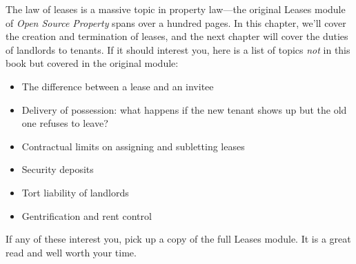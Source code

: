 The law of leases is a massive topic in property law---the original Leases
module of \emph{Open Source Property} spans over a hundred pages. In this
chapter, we'll cover the creation and termination of leases, and the next
chapter will cover the duties of landlords to tenants. If it should interest
you, here is a list of topics \emph{not} in this book but covered in the
original module:
\begin{itemize}
\item The difference between a lease and an invitee
\item Delivery of possession: what happens if the new tenant shows up but the
old one refuses to leave?


\item Contractual limits on assigning and subletting leases
\item Security deposits
\item Tort liability of landlords
\item Gentrification and rent control
\end{itemize}
If any of these interest you, pick up a copy of the full Leases module. It is a
great read and well worth your time.
